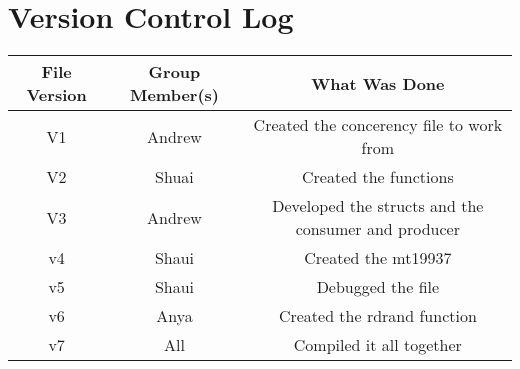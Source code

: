 \section{Version Control Log}
\begin{center}
\begin{tabular}{ |c|c|c| }
   File Version & Group Member(s) & What Was Done \\
   \hline \hline
   V1 & Andrew & Created the concerency file to work from \\
   \hline
   V2 & Shuai & Created the functions\\
   \hline
   V3 & Andrew & Developed the structs and the consumer and producer\\
   \hline
   v4 & Shaui & Created the mt19937\\
   \hline
   v5 & Shaui & Debugged the file\\
   \hline
   v6 & Anya & Created the rdrand function\\
   \hline
   v7 & All & Compiled it all together 
\end{tabular}
\end{center}

